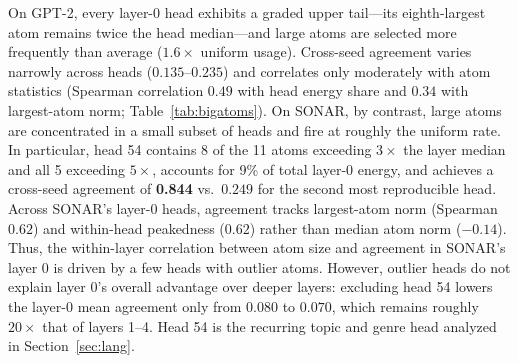 On GPT-2, every layer-0 head exhibits a graded upper tail---its
eighth-largest atom remains twice the head median---and large atoms are
selected more frequently than average ($1.6\times$ uniform usage).
Cross-seed agreement varies narrowly across heads ($0.135$--$0.235$) and
correlates only moderately with atom statistics (Spearman correlation
$0.49$ with head energy share and $0.34$ with largest-atom norm;
Table~\ref{tab:bigatoms}). On SONAR, by contrast, large atoms are
concentrated in a small subset of heads and fire at roughly the uniform
rate. In particular, head 54 contains 8 of the 11 atoms exceeding
$3\times$ the layer median and all 5 exceeding $5\times$, accounts for
9\% of total layer-0 energy, and achieves a cross-seed agreement of
\textbf{0.844} vs.\ $0.249$ for the second most reproducible head. Across
SONAR's layer-0 heads, agreement tracks largest-atom norm (Spearman
$0.62$) and within-head peakedness ($0.62$) rather than median atom norm
($-0.14$). Thus, the within-layer correlation between atom size and
agreement in SONAR's layer 0 is driven by a few heads with outlier atoms.
However, outlier heads do not explain layer 0's overall advantage over
deeper layers: excluding head 54 lowers the layer-0 mean agreement only
from $0.080$ to $0.070$, which remains roughly $20\times$ that of
layers 1--4. Head 54 is the recurring topic and genre head analyzed in
Section~\ref{sec:lang}.

